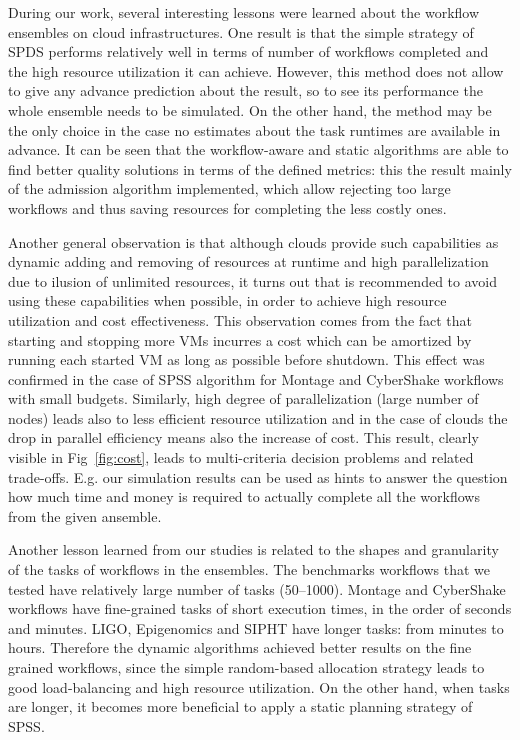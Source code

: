 \documentclass{sig-alternate}
\begin{document}
During our work, several interesting lessons were learned about the workflow
ensembles on cloud infrastructures. One result is that the simple strategy of
SPDS performs relatively well in terms of number of workflows completed and the
high resource utilization it can achieve. However, this method does not allow to
give any advance prediction about the result, so to see its performance the
whole ensemble needs to be simulated. On the other hand, the method may be
the only choice in the case no estimates about the task runtimes are available
in advance. It can be seen that the workflow-aware and static algorithms are
able to find better quality solutions in terms of the defined metrics: this the
result mainly of the admission algorithm implemented, which allow rejecting too
large workflows and thus saving resources for completing the less costly ones.

Another general observation is that although clouds provide such capabilities as
dynamic adding and removing of resources at runtime and high parallelization due
to ilusion of unlimited resources, it turns out that is recommended to avoid
using these capabilities when possible, in order to achieve high resource
utilization and cost effectiveness. This observation comes from the fact that
starting and stopping more VMs incurres a cost which can be amortized by running
each started VM as long as possible before shutdown. This effect was confirmed
in the case of SPSS algorithm for Montage and CyberShake workflows with small
budgets. Similarly, high degree of parallelization (large number of nodes) leads
also to less efficient resource utilization and in the case of clouds the drop
in parallel efficiency means also the increase of cost. This result, clearly
visible in Fig~\ref{fig:cost}, leads to multi-criteria decision problems and
related trade-offs. E.g. our simulation results can be used as hints to answer
the question how much time and money is required to actually complete all the
workflows from the given ansemble.

Another lesson learned from our studies is related to the shapes and granularity
of the tasks of workflows in the ensembles. The benchmarks workflows that we
tested have relatively large number of tasks (50--1000). Montage and CyberShake
workflows have fine-grained tasks of short execution times, in the order of
seconds and minutes. LIGO, Epigenomics and SIPHT have longer tasks: from minutes to hours.
Therefore the dynamic algorithms achieved better results on the fine grained
workflows, since the simple random-based allocation strategy leads to good
load-balancing and high resource utilization. On the other hand, when tasks are
longer, it becomes more beneficial to apply a static planning strategy of SPSS.
\end{document}
